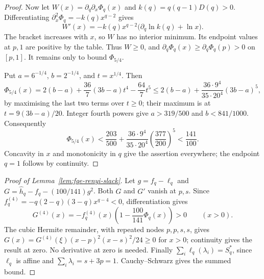 \begin{proof}
Now let $W(x)=\partial_q\partial_x\Phi_q(x)$ and
$k(q)=q(q-1)D(q)>0$. Differentiating $\partial_x^2\Phi_q=-k(q)x^{q-2}$ gives
\[
 W'(x)=-k(q)x^{q-2}\bigl(\partial_q\ln k(q)+\ln x\bigr).
\]
The bracket increases with $x$, so $W$ has no interior minimum.
Its endpoint values at $p,1$ are positive by the table. Thus $W\ge0$,
and $\partial_q\Phi_q(x)\ge\partial_q\Phi_q(p)>0$ on $[p,1]$.
It remains only to bound $\Phi_{5/4}$.

Put $a=6^{-1/4}$, $b=2^{-1/4}$, and $t=x^{1/4}$. Then
\[
 \Phi_{5/4}(x)=2(b-a)+\frac{36}{7}(3b-a)t^4-\frac{64}{7}t^5
 \le2(b-a)+\frac{36\cdot9^4}{35\cdot20^4}(3b-a)^5,
\]
by maximising the last two terms over $t\ge0$; their maximum is at
$t=9(3b-a)/20$. Integer fourth powers give $a>319/500$ and $b<841/1000$.
Consequently
\[
 \Phi_{5/4}(x)
 <\frac{203}{500}+\frac{36\cdot9^4}{35\cdot20^4}
                         \left(\frac{377}{200}\right)^5
 <\frac{141}{100}.
\]
Concavity in $x$ and monotonicity in $q$ give the assertion everywhere;
the endpoint $q=1$ follows by continuity.
\end{proof}

\begin{proof}[Proof of Lemma~\ref{lem:fqe-renyi-slack}]
Let $g=f_q-\ell_q$ and
$G=\widehat h_q-f_q-(100/141)g^2$. Both $G$ and $G'$ vanish at $p,s$.
Since $f_q^{(4)}=-q(2-q)(3-q)x^{q-4}<0$, differentiation gives
\[
 G^{(4)}(x)=-f_q^{(4)}(x)\left(1-\frac{100}{141}\Phi_q(x)\right)>0
 \qquad(x>0).
\]
The cubic Hermite remainder, with repeated nodes $p,p,s,s$, gives
$G(x)=G^{(4)}(\xi)(x-p)^2(x-s)^2/24\ge0$ for $x>0$;
continuity gives the result at zero. No derivative at zero is needed.
Finally $\sum_i\ell_q(\lambda_i)=S_q^*$, since $\ell_q$ is affine and
$\sum_i\lambda_i=s+3p=1$. Cauchy--Schwarz gives the summed bound.
\end{proof}
